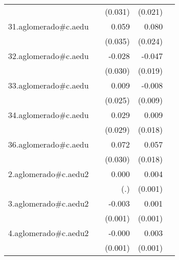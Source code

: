 {\begin{longtable}{l*{4}{D{.}{.}{-1}}}
            &                     &     (0.031)         &     (0.021)         &                     \\
\addlinespace
31.aglomerado#c.aedu&                     &       0.059         &       0.080\sym{***}&                     \\
            &                     &     (0.035)         &     (0.024)         &                     \\
\addlinespace
32.aglomerado#c.aedu&                     &      -0.028         &      -0.047\sym{*}  &                     \\
            &                     &     (0.030)         &     (0.019)         &                     \\
\addlinespace
33.aglomerado#c.aedu&                     &       0.009         &      -0.008         &                     \\
            &                     &     (0.025)         &     (0.009)         &                     \\
\addlinespace
34.aglomerado#c.aedu&                     &       0.029         &       0.009         &                     \\
            &                     &     (0.029)         &     (0.018)         &                     \\
\addlinespace
36.aglomerado#c.aedu&                     &       0.072\sym{*}  &       0.057\sym{**} &                     \\
            &                     &     (0.030)         &     (0.018)         &                     \\
\addlinespace
2.aglomerado#c.aedu2&                     &       0.000         &       0.004\sym{***}&                     \\
            &                     &         (.)         &     (0.001)         &                     \\
\addlinespace
3.aglomerado#c.aedu2&                     &      -0.003\sym{*}  &       0.001         &                     \\
            &                     &     (0.001)         &     (0.001)         &                     \\
\addlinespace
4.aglomerado#c.aedu2&                     &      -0.000         &       0.003\sym{***}&                     \\
            &                     &     (0.001)         &     (0.001)         &                     \\

\end{longtable}}
